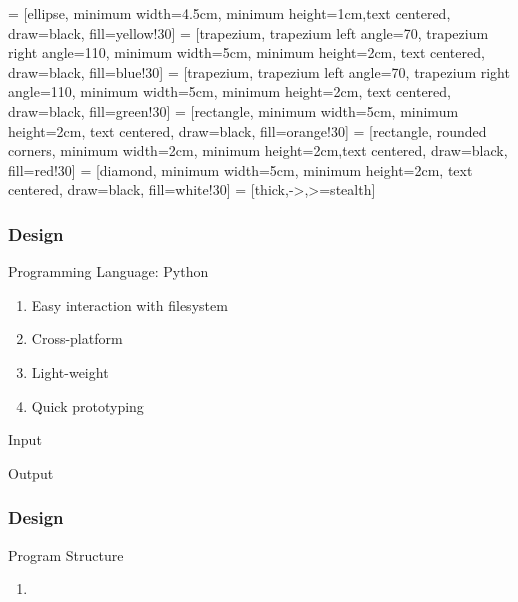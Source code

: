  = [ellipse, minimum width=4.5cm, minimum height=1cm,text centered, draw=black, fill=yellow!30]
 = [trapezium, trapezium left angle=70, trapezium right angle=110, minimum width=5cm, minimum height=2cm, text centered, draw=black, fill=blue!30]
 = [trapezium, trapezium left angle=70, trapezium right angle=110, minimum width=5cm, minimum height=2cm, text centered, draw=black, fill=green!30]
 = [rectangle, minimum width=5cm, minimum height=2cm, text centered, draw=black, fill=orange!30]
 = [rectangle, rounded corners, minimum width=2cm, minimum height=2cm,text centered, draw=black, fill=red!30]
 = [diamond, minimum width=5cm, minimum height=2cm, text centered, draw=black, fill=white!30]
 = [thick,->,>=stealth]

\begin{frame}
	\centering
	\frametitle{Design}

	\begin{block}{Programming Language: Python}	
		\begin{enumerate}
			\item Easy interaction with filesystem
			\item Cross-platform
			\item Light-weight
			\item Quick prototyping
		\end{enumerate}	
	\end{block}
	
	\pause
	
	\begin{block}{Input}
	\end{block}
	
	\pause
	
	\begin{block}{Output}
	\end{block}
	
\end{frame}

\begin{frame}
	\centering
	\frametitle{Design}
	\begin{block}{Program Structure}
		\begin{enumerate}
			\item 
		\end{enumerate}	
	\end{block}	
\end{frame}


